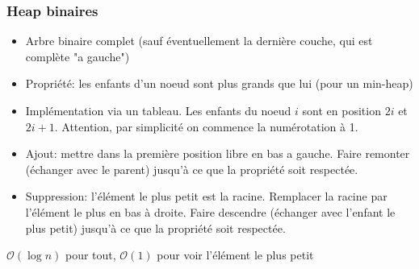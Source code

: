 \documentclass[8pt,aspectratio=169]{beamer}
\begin{document}
\begin{frame}
\frametitle{Heap binaires}
\begin{itemize}
	\item Arbre binaire complet (sauf éventuellement la dernière couche, qui est complète "a gauche")
	\item Propriété: les enfants d'un noeud sont plus grands que lui (pour un min-heap)
	\item Implémentation via un tableau. Les enfants du noeud $i$ sont en position $2i$ et $2i+1$. Attention, par simplicité on commence la numérotation à 1.
	\item Ajout: mettre dans la première position libre en bas a gauche. Faire remonter (échanger avec le parent) jusqu'à ce que la propriété soit respectée.
	\item Suppression: l'élément le plus petit est la racine. Remplacer la racine par l'élément le plus en bas à droite. Faire descendre (échanger avec l'enfant le plus petit) jusqu'à ce que la propriété soit respectée.
\end{itemize}
$\mathcal{O}(\log n)$ pour tout, $\mathcal{O}(1)$ pour voir l'élément le plus petit
\end{frame}
\end{document}
